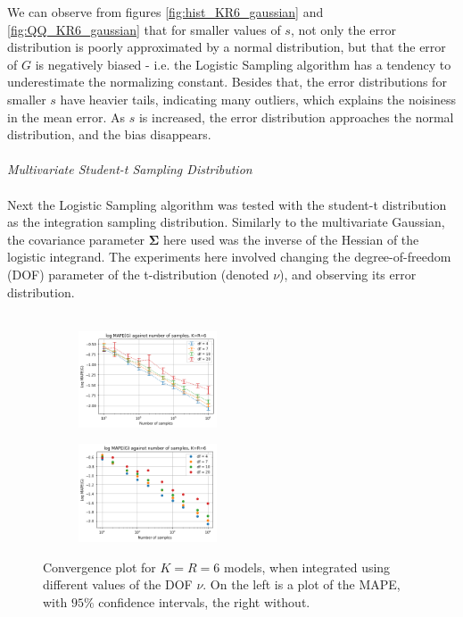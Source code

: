 We can observe from figures \ref{fig:hist_KR6_gaussian} and \ref{fig:QQ_KR6_gaussian} that for smaller values of \(s\), not only the error distribution is poorly approximated by a normal distribution, but that the error of \(G\) is negatively biased - i.e. the Logistic Sampling algorithm has a tendency to underestimate the normalizing constant. Besides that, the error distributions for smaller \(s\) have heavier tails, indicating many outliers, which explains the noisiness in the mean error. As \(s\) is increased, the error distribution approaches the normal distribution, and the bias disappears.
\\\\
\textit{{\large Multivariate Student-t Sampling Distribution}}
\\\\
Next the Logistic Sampling algorithm was tested with the student-t distribution as the integration sampling distribution. Similarly to the multivariate Gaussian, the covariance parameter \(\boldsymbol{\Sigma}\) here used was the inverse of the Hessian of the logistic integrand. The experiments here involved changing the degree-of-freedom (DOF) parameter of the t-distribution (denoted \(\nu\)), and observing its error distribution.
\\\\
\begin{figure}[!htb]
\begin{center}
\begin{subfigure}
    \centering
    \includegraphics[width=0.45\textwidth]{Chap6_EvaluationAndAnalysis/distribution_variation/Convergence_DF_KR6_tdist.png}
\end{subfigure}
\begin{subfigure}
    \centering
    \includegraphics[width=0.45\textwidth]{Chap6_EvaluationAndAnalysis/distribution_variation/Convergence_DF_KR6_tdist_meanerr.png}
\end{subfigure}
\caption{Convergence plot for \(K=R=6\) models, when integrated using different values of the DOF \(\nu\). On the left is a plot of the MAPE, with \(95\%\) confidence intervals, the right without.}
\label{fig:ConvergencePlotTDOF}
\end{center}
\end{figure}

